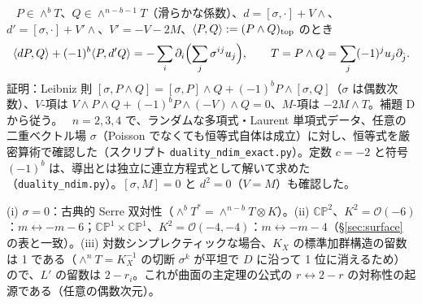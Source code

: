 \begin{lem}[補題 E：転置恒等式]\tP\ \tV\label{lem:E}
$P\in\wedge^bT$、$Q\in\wedge^{n-b-1}T$（滑らかな係数）、$d=[\sigma,\cdot]+V\wedge$、$d'=[\sigma,\cdot]+V'\wedge$、$V'=-V-2M$、$\langle P,Q\rangle:=(P\wedge Q)_{\rm top}$ のとき
\[\langle dP,Q\rangle+(-1)^b\langle P,d'Q\rangle=-\sum_i\partial_i\Bigl(\sum_j\sigma^{ij}u_j\Bigr),\qquad T=P\wedge Q=\sum_j(-1)^ju_j\partial_{\hat j}.\]
証明：Leibniz 則 $[\sigma,P\wedge Q]=[\sigma,P]\wedge Q+(-1)^bP\wedge[\sigma,Q]$（$\sigma$ は偶数次数）、$V$-項は $V\wedge P\wedge Q+(-1)^bP\wedge(-V)\wedge Q=0$、$M$-項は $-2M\wedge T$。補題 D から従う。
\tV\ $n=2,3,4$ で、ランダムな多項式・Laurent 単項式データ、任意の二重ベクトル場 $\sigma$（Poisson でなくても恒等式自体は成立）に対し、恒等式を厳密算術で確認した（スクリプト \texttt{duality\_ndim\_exact.py}）。定数 $c=-2$ と符号 $(-1)^b$ は、導出とは独立に連立方程式として解いて求めた（\texttt{duality\_ndim.py}）。$[\sigma,M]=0$ と $d^2=0$（$V=M$）も確認した。
\end{lem}
\begin{rem}[整合性の確認\ \tV]
(i) $\sigma=0$：古典的 Serre 双対性（$\wedge^bT^*=\wedge^{n-b}T\otimes K$）。(ii) $\mathbb{CP}^2$、$K^2=\mathcal O(-6)$：$m\leftrightarrow-m-6$；$\mathbb{CP}^1\times\mathbb{CP}^1$、$K^2=\mathcal O(-4,-4)$：$m\leftrightarrow-m-4$（\S\ref{sec:surface} の表と一致）。(iii) 対数シンプレクティックな場合、$K_X$ の標準加群構造の留数は 1 である（$\wedge^nT=K_X^{-1}$ の切断 $\sigma^k$ が平坦で $D$ に沿って 1 位に消えるため）ので、$L'$ の留数は $2-r_i$。これが曲面の主定理の公式の $r\leftrightarrow2-r$ の対称性の起源である（任意の偶数次元）。
\end{rem}
